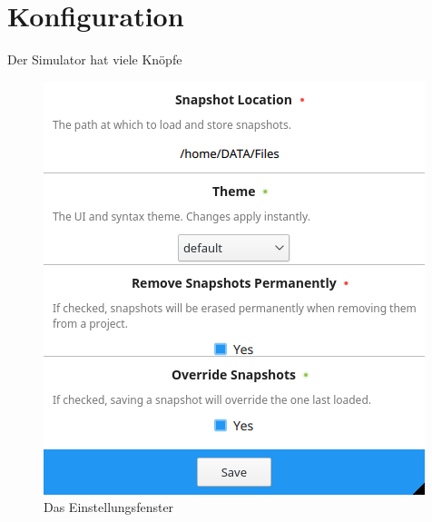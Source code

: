 
\section{Konfiguration}

Der Simulator hat viele Knöpfe



\begin{figure}[ht]
	\centering
  \includegraphics[scale=1]{Images/Settings}
	\caption{Das Einstellungsfenster}
	\label{Settings}
\end{figure}
